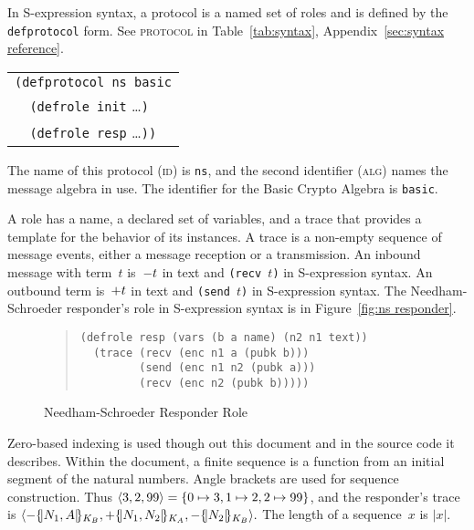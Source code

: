 \documentclass[12pt]{article}
\begin{document}
In S-expression syntax, a protocol is a named set of roles and is
defined by the \texttt{defprotocol} form.  See \textsc{protocol} in
Table~\ref{tab:syntax}, Appendix~\ref{sec:syntax reference}.
\begin{center}
\begin{tabular}{l}
\verb|(defprotocol ns basic|\\
\verb|  (defrole init| \ldots\texttt{)}\\
\verb|  (defrole resp| \ldots\texttt{))}
\end{tabular}
\end{center}

The name of this protocol (\textsc{id}) is \texttt{ns}, and the second
identifier (\textsc{alg}) names the message algebra in use.  The
identifier for the Basic Crypto Algebra is \texttt{basic}.

A role has a name, a declared set of variables, and a trace that
provides a template for the behavior of its instances.  A trace is a
non-empty sequence of message events, either a message reception or a
transmission.  An inbound message with term~$t$
is~$\mathord - t$ in text and \texttt{(recv $t$)} in S-expression syntax.
An outbound term is~$\mathord + t$ in text and
\texttt{(send $t$)} in S-expression syntax.  The Needham-Schroeder
responder's role in S-expression syntax is in Figure~\ref{fig:ns
  responder}.


\begin{figure}
\begin{quote}
\begin{verbatim}
(defrole resp (vars (b a name) (n2 n1 text))
  (trace (recv (enc n1 a (pubk b)))
         (send (enc n1 n2 (pubk a)))
         (recv (enc n2 (pubk b)))))
\end{verbatim}
\end{quote}
\caption{Needham-Schroeder Responder Role}
\label{fig:ns responder}
\end{figure}

Zero-based indexing is used though out this document and in the source code
it describes.  Within the document, a finite sequence is a function
from an initial segment of the natural numbers.  Angle brackets are
used for sequence construction.  Thus $\langle3,2,99\rangle = \{0\mapsto 3,
1\mapsto 2, 2\mapsto 99\}$, and the responder's trace is
$\langle\mathord -\{\!|N_1, A|\!\}_{K_B}, \mathord +\{\!|N_1,
    N_2|\!\}_{K_A},\mathord -\{\!|N_2|\!\}_{K_B}\rangle.$ The length of a sequence~$x$ is
$|x|$.  \nocite{Dijkstra82}
\end{document}
